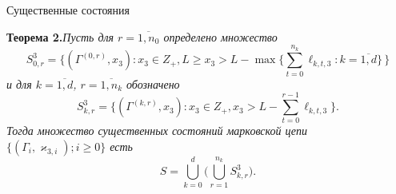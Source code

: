 \documentclass[10pt]{beamer}
\begin{document}
\begin{frame}{Существенные состояния}

\begin{block}
    {\bf Теорема 2.}{\it Пусть для $r=\overline{1,n_0}$ определено множество $$S^3_{0,r} =\bigl\{(\Gamma^{(0,r)},x_3)  \colon x_3\in Z_+,  L \geqslant x_3 > L - \max\bigl\{\sum_{t=0}^{n_k} \ell_{k,t,3}\colon k=\overline{1,d}\bigr\}\,\bigr\}$$ 
    и  для $k=\overline{1,d}$, $r=\overline{1,n_k}$ обозначено $$S^3_{k,r} =  \{(\Gamma^{(k,r)},x_3) \colon x_3\in Z_+, x_3 > L - \sum_{t=0}^{r-1} \ell_{k,t,3}\}.$$ Тогда множество существенных состояний марковской цепи $\{(\Gamma_i, \varkappa_{3,i}); i \geqslant 0\}$ есть $$S=\bigcup_{k=0}^d \bigl(\bigcup_{r=1}^{n_k} S^3_{k,r}\bigr).$$}
\end{block}
\end{frame}
\end{document}
